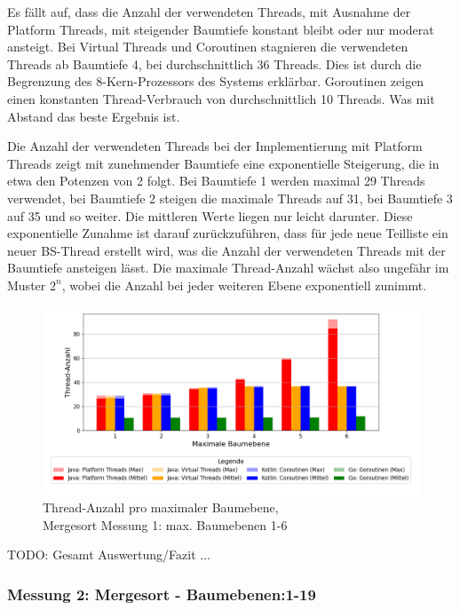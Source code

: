 \documentclass[fontsize=12pt,paper=a4,twoside=semi,parskip=half-,headsepline,headinclude]{scrreprt}
\begin{document}
Es fällt auf, dass die Anzahl der verwendeten Threads, mit Ausnahme der Platform Threads, mit steigender Baumtiefe konstant bleibt oder nur moderat ansteigt. Bei Virtual Threads und Coroutinen stagnieren die verwendeten Threads ab Baumtiefe 4, bei durchschnittlich 36 Threads. Dies ist durch die Begrenzung des 8-Kern-Prozessors des Systems erklärbar. Goroutinen zeigen einen konstanten Thread-Verbrauch von durchschnittlich 10 Threads. Was mit Abstand das beste Ergebnis ist. 

Die Anzahl der verwendeten Threads bei der Implementierung mit Platform Threads zeigt mit zunehmender Baumtiefe eine exponentielle Steigerung, die in etwa den Potenzen von 2 folgt. Bei Baumtiefe 1 werden maximal 29 Threads verwendet, bei Baumtiefe 2 steigen die maximale Threads auf 31, bei Baumtiefe 3 auf 35 und so weiter. Die mittleren Werte liegen nur leicht darunter. Diese exponentielle Zunahme ist darauf zurückzuführen, dass für jede neue Teilliste ein neuer BS-Thread erstellt wird, was die Anzahl der verwendeten Threads mit der Baumtiefe ansteigen lässt. Die maximale Thread-Anzahl wächst also ungefähr im Muster $2^n$, wobei die Anzahl bei jeder weiteren Ebene exponentiell zunimmt.

\begin{figure}[H]
	\centering
	\includegraphics[scale=0.5]{figures/mergesort/Maximalebauebenen1-6/num_threads_bar_plot.png}
	\caption{Thread-Anzahl pro maximaler Baumebene,\\ Mergesort Messung 1: max. Baumebenen 1-6}
	\label{fig:ms1-6Threads}
\end{figure}

TODO: Gesamt Auswertung/Fazit ...

\subsubsection{Messung 2: Mergesort - Baumebenen:1-19}
\end{document}
